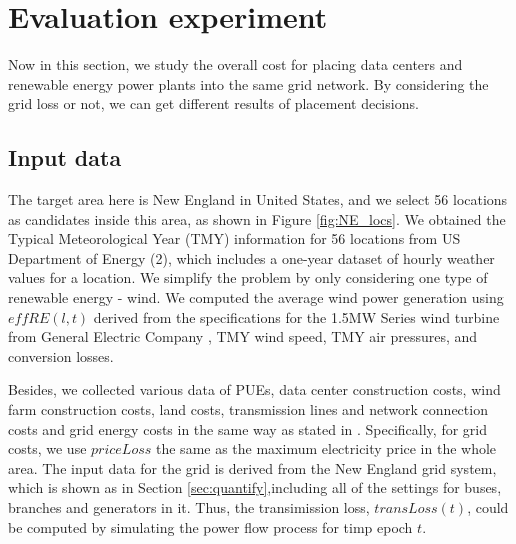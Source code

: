 \section{Evaluation experiment}
\label{sec:eval}

Now in this section, we study the overall cost for placing data centers and renewable energy power plants into the same grid network. By considering the grid loss or not, we can get different results of placement decisions.

\subsection{Input data}

The target area here is New England in United States, and we select 56 locations as candidates inside this area, as shown in Figure \ref{fig:NE_locs}. We obtained the Typical Meteorological Year (TMY) information for 56 locations from US Department of Energy (2), which includes a one-year dataset of hourly weather values for a location. We simplify the problem by only considering one type of renewable energy - wind. We computed the average wind power generation using $\textit{eff}RE(l,t)$ derived from the specifications for the 1.5MW Series wind turbine from General Electric Company \cite{GE15MW}, TMY wind speed, TMY air pressures, and conversion losses.

Besides, we collected various data of PUEs, data center construction costs, wind farm construction costs, land costs, transmission lines and network connection costs and grid energy costs in the same way as stated in \cite{berral2014building}. Specifically, for grid costs, we use $priceLoss$ the same as the maximum electricity price in the whole area. The input data for the grid is derived from the New England grid system, which is shown as in Section \ref{sec:quantify},including all of the settings for buses, branches and generators in it. Thus, the transimission loss, $transLoss(t)$, could be computed by simulating the power flow process for timp epoch $t$.  %


